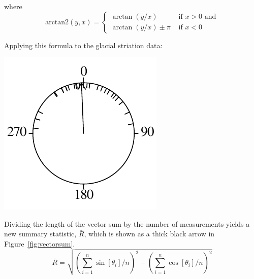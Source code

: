\noindent where
\begin{equation}
  \mbox{arctan2}(y,x) = 
  \begin{cases}
    \arctan(y/x) & \mbox{~if~} x>0 \mbox{~and} \\
    \arctan(y/x) \pm \pi & \mbox{~if~} x<0
  \end{cases}
\end{equation}

Applying this formula to the glacial striation data:

\noindent\begin{minipage}[t][][b]{.25\textwidth}
\includegraphics[width=\textwidth]{../figures/circle3.pdf}\medskip
\end{minipage}
\begin{minipage}[t][][t]{.75\textwidth}
  \label{fig:circle3}
\end{minipage}

Dividing the length of the vector sum by the number of measurements
yields a new summary statistic, $\bar{R}$, which is shown as a thick
black arrow in Figure~\ref{fig:vectorsum}.
\begin{equation}
  \bar{R} = \sqrt{\left(\sum_{i=1}^{n} \sin[\theta_i]/n\right)^2 +
    \left( \sum_{i=1}^{n}\cos[\theta_i]/n \right)^2}
  \label{eq:circularR}
\end{equation}

